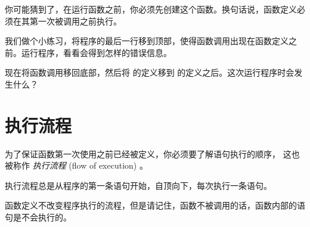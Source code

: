 

你可能猜到了，在运行函数之前，你必须先创建这个函数。换句话说，函数定义必须在其第一次被调用之前执行。


我们做个小练习，将程序的最后一行移到顶部，使得函数调用出现在函数定义之前。运行程序，看看会得到怎样的错误信息。



现在将函数调用移回底部，然后将  的定义移到  的定义之后。这次运行程序时会发生什么？


%
\section{执行流程}
  


为了保证函数第一次使用之前已经被定义，你必须要了解语句执行的顺序，
这也被称作 {\em 执行流程} (flow of execution) 。


执行流程总是从程序的第一条语句开始，自顶向下，每次执行一条语句。


函数定义不改变程序执行的流程，但是请记住，函数不被调用的话，函数内部的语句是不会执行的。

